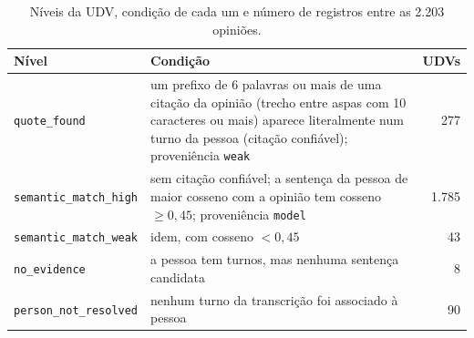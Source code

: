 \begin{table}[!htb]
  \centering
  \caption{Níveis da UDV, condição de cada um e número de registros entre as 2.203 opiniões.}
  \label{tab:udv-niveis}
  \small
  \begin{tabularx}{\textwidth}{@{}lXr@{}}
    \toprule
    \textbf{Nível} & \textbf{Condição} & \textbf{UDVs} \\
    \midrule
    \texttt{quote\_found}         & um prefixo de 6 palavras ou mais de uma citação da opinião (trecho entre aspas com 10 caracteres ou mais) aparece literalmente num turno da pessoa (citação confiável); proveniência \texttt{weak} & 277 \\
    \texttt{semantic\_match\_high} & sem citação confiável; a sentença da pessoa de maior cosseno com a opinião tem cosseno $\geq 0{,}45$; proveniência \texttt{model} & 1.785 \\
    \texttt{semantic\_match\_weak} & idem, com cosseno $< 0{,}45$ & 43 \\
    \texttt{no\_evidence}         & a pessoa tem turnos, mas nenhuma sentença candidata & 8 \\
    \texttt{person\_not\_resolved} & nenhum turno da transcrição foi associado à pessoa & 90 \\
    \bottomrule
  \end{tabularx}
\end{table}
